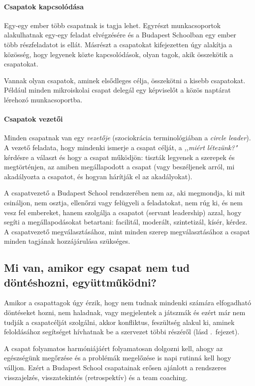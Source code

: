 \paragraph{Csapatok kapcsolódása}
Egy-egy ember több csapatnak is tagja lehet. Egyrészt munkacsoportok alakulhatnak egy-egy feladat elvégzésére és a Budapest Schoolban egy ember több részfeladatot is ellát. Másrészt a csapatokat kifejezetten úgy alakítja a közösség, hogy legyenek közte kapcsolódások, olyan tagok, akik összekötik a csapatokat.

Vannak olyan csapatok, aminek elsődleges célja, összekötni a kisebb csapatokat. Például minden mikroiskolai csapat delegál egy képviselőt a közös naptárat lérehozó munkacsoportba.


\paragraph{Csapatok vezetői}
Minden csapatnak van egy \emph{vezetője} (szociokrácia terminológiában a \emph{circle leader}). A vezető feladata,  hogy mindenki ismerje a csapat célját, a \emph{,,miért létezünk?"} kérdésre a választ és hogy a csapat működjön: tiszták legyenek a szerepek és megtörténjen, az amiben megállapodott a csapat (vagy beszéljenek arról, mi akadályozta a csapatot, és hogyan hárítják el az akadályokat). 

A csapatvezető a Budapest School rendszerében nem az, aki megmondja, ki mit csináljon, nem osztja, ellenőrzi vagy felügyeli a feladatokat, nem rúg ki, és nem vesz fel embereket, hanem szolgálja a csapatot (servant leadership) azzal, hogy segíti a megállapodásokat betartani: facilitál, moderált, szintetizál, kísér, kérdez. A csapatvezető megválasztásához, mint minden szerep megválasztásához a csapat minden tagjának hozzájárulása szükséges.

\subsection{Mi van, amikor egy csapat nem tud döntéshozni, együttműködni?}
Amikor a csapattagok úgy érzik, hogy nem tudnak mindenki számára elfogadható döntéseket hozni, nem haladnak, vagy megjelentek a játszmák és ezért már nem tudják a csapatcélját szolgálni, akkor konfliktus, feszültség alakul ki, aminek feloldásához segítséget hívhatnak be a szervezet többi részéről (lásd .~fejezet).

A csapat folyamatos harmóniájáért folyamatosan dolgozni kell, ahogy az egészségünk megőrzése és a problémák megelőzése is napi rutinná kell hogy válljon. Ezért a Budapest School csapatainak erősen ajánlott a rendszeres visszajelzés, visszatekintés (retrospektív) és a team coaching.